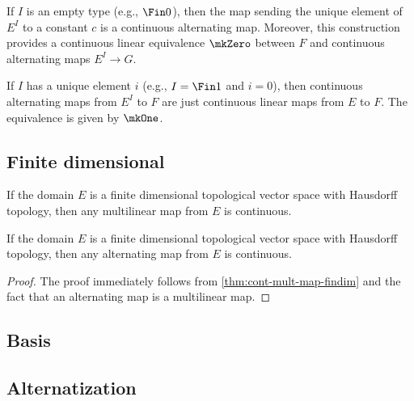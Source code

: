 \begin{definition}%
  \label{def:cont-alt-map-zero}
  If \(I\) is an empty type (e.g., \(\Fin 0\)),
  then the map sending the unique element of \(E^{I}\) to a constant \(c\)
  is a continuous alternating map.
  Moreover, this construction provides a continuous linear equivalence \(\mkZero\)
  between \(F\) and continuous alternating maps \(E^{I} \to G\).
\end{definition}

\begin{definition}%
  \label{def:cont-alt-map-one}
  If \(I\) has a unique element \(i\) (e.g., \(I = \Fin 1\) and \(i = 0\)),
  then continuous alternating maps from \(E^{I}\) to \(F\) are just continuous linear maps from \(E\) to \(F\).
  The equivalence is given by \(\mkOne\).
\end{definition}

\subsection{Finite dimensional}%
\label{sec:finite-dimensional}

\begin{theorem}%
  \label{thm:cont-mult-map-findim}
  If the domain \(E\) is a finite dimensional topological vector space with Hausdorff topology,
  then any multilinear map from \(E\) is continuous.
\end{theorem}

\begin{theorem}%
  \label{thm:cont-alt-map-findim}
  If the domain \(E\) is a finite dimensional topological vector space with Hausdorff topology,
  then any alternating map from \(E\) is continuous.
\end{theorem}
\begin{proof}
  The proof immediately follows from \autoref{thm:cont-mult-map-findim} and the fact that an alternating map is a multilinear map.
\end{proof}
\subsection{Basis}%
\label{sec:basis}


\subsection{Alternatization}%
\label{sec:alternatization}

